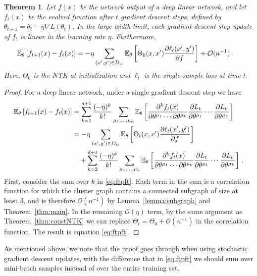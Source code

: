 \documentclass[english]{article}
\newtheorem{thm}{Theorem}
\newcommand{\dho}{\partial}
\newcommand{\cO}{\ensuremath{\mathcal{O}}}
\newcommand{\lexpp}[1]{\mathbb{E}_{#1}\left[}
\newcommand{\rexp}{\right]}
\begin{document}
\begin{thm}\label{thm:etalin}
  Let $f(x)$ be the network output of a deep linear network, and let $f_t(x)$ be the evolved function after $t$ gradient descent steps, defined by $\theta_{t+1} = \theta_t - \eta \nabla L(\theta_t)$.
  In the large width limit, each gradient descent step update of $f_t$ is linear in the learning rate $\eta$.
  Furthermore,
  \begin{align}
    \lexpp{\theta} f_{t+1}(x) - f_t(x) \rexp &=
    -\eta \sum_{(x',y')\in D_{\rm tr}} \lexpp{\theta} \Theta_0(x,x') \frac{\dho \ell_t(x',y')}{\dho f} \rexp
    + \cO(n^{-1}) \,. \label{eq:ftpft}
  \end{align}
  Here, $\Theta_0$ is the NTK at initialization and $\ell_t$ is the single-sample loss at time $t$.
\end{thm}
\begin{proof}
  For a deep linear network, under a single gradient descent step we have
  \begin{align}
    \lexpp{\theta} f_{t+1}(x) - f_t(x) \rexp &=
    \sum_{k=1}^{d+1} \frac{(-\eta)^k}{k!}
    \sum_{\mu_1,\dots,\mu_k}
    \lexpp{\theta}
    \frac{\dho^k f_t(x)}{\dho \theta^{\mu_1} \cdots \dho \theta^{\mu_k}}
    \frac{\dho L_t}{\dho \theta^{\mu_1}} \cdots \frac{\dho L_t}{\dho \theta^{\mu_k}}
    \rexp
    \\ &=
    -\eta \sum_{(x',y')\in D_{\rm tr}}
    \lexpp{\theta}
    \Theta_t(x,x')
    \frac{\dho \ell_t(x',y')}{\dho f}
    \rexp
    \cr &\quad
    +
    \sum_{k=2}^{d+1} \frac{(-\eta)^k}{k!}
    \sum_{\mu_1,\dots,\mu_k}
    \lexpp{\theta}
    \frac{\dho^k f_t(x)}{\dho \theta^{\mu_1} \cdots \dho \theta^{\mu_k}}
    \frac{\dho L_t}{\dho \theta^{\mu_1}} \cdots \frac{\dho L_t}{\dho \theta^{\mu_k}}
    \rexp
    \,. 
  \end{align}
  First, consider the sum over $k$ in \eqref{eq:ftpft}.
  Each term in the sum is a correlation function for which the cluster graph contains a connected subgraph of size at least 3, and is therefore $\cO(n^{-1})$ by Lemma~\ref{lemma:subgraph} and Theorem~\ref{thm:main}.
  In the remaining $\cO(\eta)$ term, by the same argument as Theorem~\ref{thm:constNTK} we can replace $\Theta_t = \Theta_0 + \cO(n^{-1})$ in the correlation function.
  The result is equation \eqref{eq:ftpft}.
\end{proof}
As mentioned above, we note that the proof goes through when using stochastic gradient descent updates, with the difference that in \eqref{eq:ftpft} we should sum over mini-batch samples instead of over the entire training set.
\end{document}
